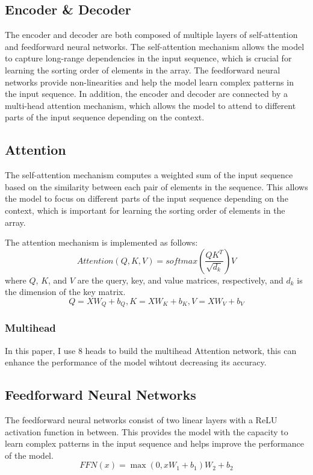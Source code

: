 \documentclass{article}
\begin{document}
\subsection{Encoder \& Decoder}
The encoder and decoder are both composed of multiple layers of self-attention and feedforward neural networks. The self-attention mechanism allows the model to capture long-range dependencies in the input sequence, which is crucial for learning the sorting order of elements in the array. The feedforward neural networks provide non-linearities and help the model learn complex patterns in the input sequence. In addition, the encoder and decoder are connected by a multi-head attention mechanism, which allows the model to attend to different parts of the input sequence depending on the context.

\subsection{Attention}
The self-attention mechanism computes a weighted sum of the input sequence based on the similarity between each pair of elements in the sequence. This allows the model to focus on different parts of the input sequence depending on the context, which is important for learning the sorting order of elements in the array.

The attention mechanism is implemented as follows:
\begin{equation}
    Attention(Q, K, V) = softmax(\frac{QK^T}{\sqrt{d_k}})V
\end{equation}
where $Q$, $K$, and $V$ are the query, key, and value matrices, respectively, and $d_k$ is the dimension of the key matrix.
\begin{equation}
    Q = XW_Q+b_Q, K = XW_K+b_K, V = XW_V+b_V
\end{equation}

\subsubsection*{Multihead}
In this paper, I use 8 heads to build the multihead Attention network, this can enhance the performance of the model wihtout decreasing its accuracy.

\subsection{Feedforward Neural Networks}
The feedforward neural networks consist of two linear layers with a ReLU activation function in between. This provides the model with the capacity to learn complex patterns in the input sequence and helps improve the performance of the model.
\begin{equation}
    FFN(x) = \max(0, xW_1 + b_1)W_2 + b_2
\end{equation}
\end{document}
